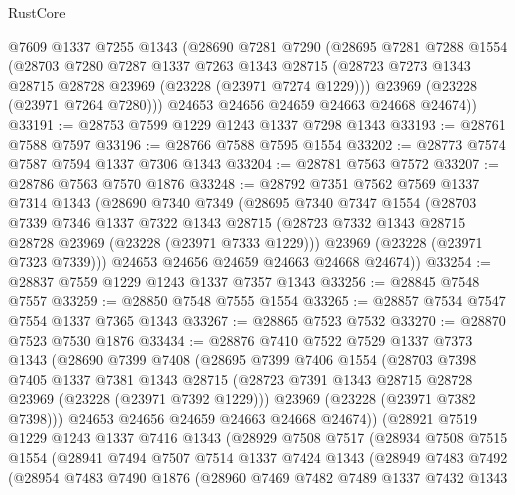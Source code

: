 \begin{lexlean}{RustCore}
\begin{coremodule}
    @7609
    @1337
    @7255
    @1343
    (@28690
      @7281
      @7290
      (@28695
        @7281
        @7288
        @1554
        (@28703
          @7280
          @7287
          @1337
          @7263
          @1343
          @28715
          (@28723 @7273 @1343 @28715 @28728 @23969 (@23228 (@23971 @7274 @1229)))
          @23969
          (@23228 (@23971 @7264 @7280)))
        @24653
        @24656
        @24659
        @24663
        @24668
        @24674))
@33191 := @28753 @7599 @1229 @1243 @1337 @7298 @1343
@33193 := @28761 @7588 @7597
@33196 := @28766 @7588 @7595 @1554
@33202 := @28773 @7574 @7587 @7594 @1337 @7306 @1343
@33204 := @28781 @7563 @7572
@33207 := @28786 @7563 @7570 @1876
@33248 := @28792
    @7351
    @7562
    @7569
    @1337
    @7314
    @1343
    (@28690
      @7340
      @7349
      (@28695
        @7340
        @7347
        @1554
        (@28703
          @7339
          @7346
          @1337
          @7322
          @1343
          @28715
          (@28723 @7332 @1343 @28715 @28728 @23969 (@23228 (@23971 @7333 @1229)))
          @23969
          (@23228 (@23971 @7323 @7339)))
        @24653
        @24656
        @24659
        @24663
        @24668
        @24674))
@33254 := @28837 @7559 @1229 @1243 @1337 @7357 @1343
@33256 := @28845 @7548 @7557
@33259 := @28850 @7548 @7555 @1554
@33265 := @28857 @7534 @7547 @7554 @1337 @7365 @1343
@33267 := @28865 @7523 @7532
@33270 := @28870 @7523 @7530 @1876
@33434 := @28876
    @7410
    @7522
    @7529
    @1337
    @7373
    @1343
    (@28690
      @7399
      @7408
      (@28695
        @7399
        @7406
        @1554
        (@28703
          @7398
          @7405
          @1337
          @7381
          @1343
          @28715
          (@28723 @7391 @1343 @28715 @28728 @23969 (@23228 (@23971 @7392 @1229)))
          @23969
          (@23228 (@23971 @7382 @7398)))
        @24653
        @24656
        @24659
        @24663
        @24668
        @24674))
    (@28921
      @7519
      @1229
      @1243
      @1337
      @7416
      @1343
      (@28929
        @7508
        @7517
        (@28934
          @7508
          @7515
          @1554
          (@28941
            @7494
            @7507
            @7514
            @1337
            @7424
            @1343
            (@28949
              @7483
              @7492
              (@28954
                @7483
                @7490
                @1876
                (@28960
                  @7469
                  @7482
                  @7489
                  @1337
                  @7432
                  @1343

\end{coremodule}
\end{lexlean}
